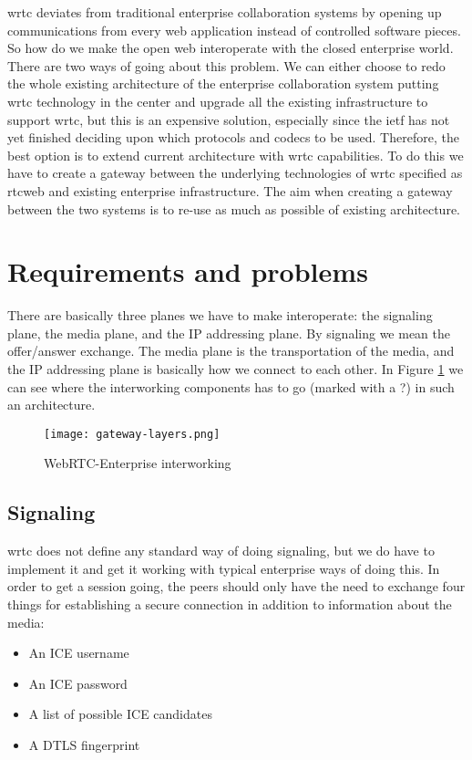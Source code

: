 \gls{wrtc} deviates from traditional enterprise collaboration systems by opening up communications from every web application instead of controlled software pieces. So how do we make the open web interoperate with the closed enterprise world. There are two ways of going about this problem. We can either choose to redo the whole existing architecture of the enterprise collaboration system putting \gls{wrtc} technology in the center and upgrade all the existing infrastructure to support \gls{wrtc}, but this is an expensive solution, especially since the \gls{ietf} has not yet finished deciding upon which protocols and codecs to be used. Therefore, the best option is to extend current architecture with \gls{wrtc} capabilities. To do this we have to create a gateway between the underlying technologies of \gls{wrtc} specified as \gls{rtcweb} and existing enterprise infrastructure. The aim when creating a gateway between the two systems is to re-use as much as possible of existing architecture.

\section{Requirements and problems}
There are basically three planes we have to make interoperate: the signaling plane, the media plane, and the IP addressing plane. 
By signaling we mean the offer/answer exchange. The media plane is the transportation of the media, and the IP addressing plane is basically how we connect to each other. In Figure \ref{fig:gateway-layers} we can see where the interworking components has to go (marked with a ?) in such an architecture.

\begin{figure}[here]
\centerline{\texttt{[image: gateway-layers.png]}}
\caption{WebRTC-Enterprise interworking}
\label{fig:gateway-layers}
\end{figure}

\subsection{Signaling}
\gls{wrtc} does not define any standard way of doing signaling, but we do have to implement it and get it working with typical enterprise ways of doing this. In order to get a session going, the peers should only have the need to exchange four things for establishing a secure connection in addition to information about the media:

\begin{itemize}
\item{An ICE username}
\item{An ICE password}
\item{A list of possible ICE candidates}
\item{A DTLS fingerprint}
\end{itemize}

